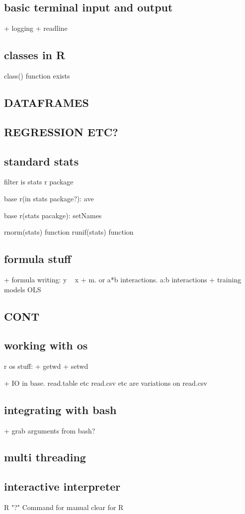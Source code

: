 \subsection{basic terminal input and output}
+ logging
+ readline

\subsection{classes in R}
class() function exists
\subsection{DATAFRAMES}
\subsection{REGRESSION ETC?}
\subsection{standard stats}
filter is stats r package

base r(in stats package?): ave

base r(stats pacakge): setNames

rnorm(stats) function
runif(stats) function
\subsection{formula stuff}
+ formula writing: y ~ x + m. or a*b interactions. a:b interactions
+ training models OLS
\subsection{CONT}
\subsection{working with os}
r os stuff:
+ getwd
+ setwd

+ IO in base. read.table etc read.csv etc are variations on read.csv
\subsection{integrating with bash}
+ grab arguments from bash?
\subsection{multi threading}
\subsection{interactive interpreter}
R "?" Command for manual
clear for R
